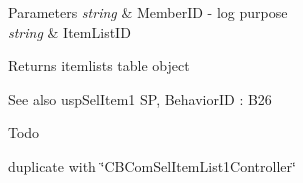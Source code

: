 \begin{DoxyParams}{Parameters}
{\em string} & Member\+ID -\/ log purpose \\
\hline
{\em string} & Item\+List\+ID \\
\hline
\end{DoxyParams}
\begin{DoxyReturn}{Returns}
itemlists table object 
\end{DoxyReturn}
\begin{DoxySeeAlso}{See also}
usp\+Sel\+Item1 SP, Behavior\+ID \+: B26 
\end{DoxySeeAlso}
\begin{DoxyRefDesc}{Todo}
\item[\hyperlink{a00001__todo000009}{Todo}]duplicate with \char`\"{}\+C\+B\+Com\+Sel\+Item\+List1\+Controller\char`\"{} \end{DoxyRefDesc}
